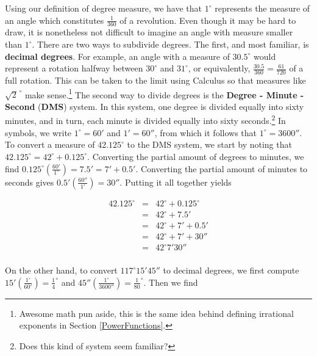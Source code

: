 Using our definition of degree measure, we have that $1^{\circ}$ represents the measure of an angle which constitutes $\frac{1}{360}$ of a revolution.  Even though it may be hard to draw, it is nonetheless not difficult to imagine an angle with measure smaller than $1^{\circ}$.  There are two ways to subdivide degrees.  The first, and most familiar, is \textbf{decimal degrees}.  For example, an angle with a measure of $30.5^{\circ}$ would represent a rotation halfway between $30^{\circ}$ and $31^{\circ}$, or equivalently, $\frac{30.5}{360} = \frac{61}{720}$ of a full rotation.  This can be taken to the limit using Calculus so that measures like $\sqrt{2}^{\, \circ}$ make sense.\footnote{Awesome math pun aside, this is the same idea behind defining irrational exponents in Section \ref{PowerFunctions}.}  The second way to divide degrees is the \textbf{Degree - Minute - Second} (\textbf{DMS}) system.  In this system, one degree is divided equally into sixty minutes, and in turn, each minute is divided equally into sixty seconds.\footnote{Does this kind of system seem familiar?}  In symbols, we write $1^{\circ} = 60'$ and $1' = 60''$, from which it follows that  $1^{\circ} = 3600''$.  To convert a measure of $42.125^{\circ}$ to the DMS system, we start by noting that $42.125^{\circ} = 42^{\circ} + 0.125^{\circ}$. Converting the partial amount of degrees to minutes, we find $0.125^{\circ} \left( \frac{60'}{1^{\circ}} \right) = 7.5' = 7' + 0.5'$. Converting the partial amount of minutes to seconds gives  $0.5' \left(\frac{60''}{1'} \right) = 30''$.  Putting it all together yields 

\[ \begin{array}{rcl}

42.125^{\circ} & = &  42^{\circ} + 0.125^{\circ} \\
               & = & 42^{\circ} + 7.5' \\
               & = & 42^{\circ} + 7' + 0.5' \\
               & = & 42^{\circ} + 7' + 30'' \\
               & = & 42^{\circ} 7' 30'' \\ \end{array} \]
      
On the other hand, to convert $117^{\circ}15'45''$ to decimal degrees, we first compute $15' \left(\frac{1^{\circ}}{60'}\right) = \frac{1}{4}^{\circ}$ and $45'' \left(\frac{1^{\circ}}{3600''}\right) = \frac{1}{80}^{\circ}$. Then we find

